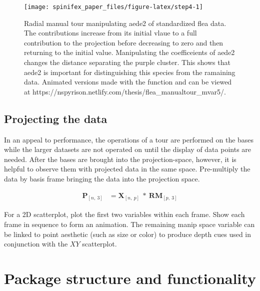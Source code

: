 \begin{Schunk}
\begin{figure}

{\centering \texttt{[image: spinifex\_paper\_files/figure-latex/step4-1]} 

}

\caption[Radial manual tour manipulating aede2 of standardized flea data]{Radial manual tour manipulating aede2 of standardized flea data. The contributions increase from its initial vlaue to a full contribution to the projection before decreasing to zero and then returning to the initial value. Manipulating the coefficeients of aede2 changes the distance separating the purple cluster. This shows that aede2 is important for distinguishing this species from the ramaining data. Animated versions made with the  function and can be viewed at https://nspyrison.netlify.com/thesis/flea\_manualtour\_mvar5/.}\label{fig:step4}
\end{figure}
\end{Schunk}

\hypertarget{sec:display}{%
\subsection{Projecting the data}\label{sec:display}}

In an appeal to performance, the operations of a tour are performed on
the bases while the larger datasets are not operated on until the
display of data points are needed. After the bases are brought into the
projection-space, however, it is helpful to observe them with projected
data in the same space. Pre-multiply the data by basis frame bringing
the data into the projection space.

\begin{align*}
  \textbf{P}_{[n,~3]} &= \textbf{X}_{[n,~p]} ~*~ \textbf{RM}_{[p,~3]}
\end{align*}

For a 2D scatterplot, plot the first two variables within each frame.
Show each frame in sequence to form an animation. The remaining manip
space variable can be linked to point aesthetic (such as size or color)
to produce depth cues used in conjunction with the \(XY\) scatterplot.

\hypertarget{sec:usage}{%
\section{Package structure and functionality}\label{sec:usage}}

